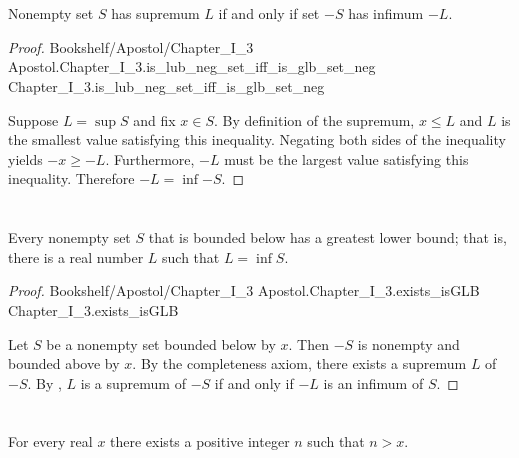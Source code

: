 \documentclass{article}
\newcommand{\link}[1]{\lean{../..}
  {Bookshelf/Apostol/Chapter\_I\_3}
  {Apostol.Chapter\_I\_3.#1}
  {Chapter\_I\_3.#1}
}
\begin{document}

\section*{}%
%

Nonempty set $S$ has supremum $L$ if and only if set $-S$ has infimum $-L$.

\begin{proof}

  \link{is\_lub\_neg\_set\_iff\_is\_glb\_set\_neg}

  \divider

  Suppose $L = \sup{S}$ and fix $x \in S$.
  By definition of the supremum, $x \leq L$ and $L$ is the smallest value
    satisfying this inequality.
  Negating both sides of the inequality yields $-x \geq -L$.
  Furthermore, $-L$ must be the largest value satisfying this inequality.
  Therefore $-L = \inf{-S}$.

\end{proof}

\section*{}%
%

Every nonempty set $S$ that is bounded below has a greatest lower bound; that
  is, there is a real number $L$ such that $L = \inf{S}$.

\begin{proof}

  \link{exists\_isGLB}

  \divider

  Let $S$ be a nonempty set bounded below by $x$.
  Then $-S$ is nonempty and bounded above by $x$.
  By the completeness axiom, there exists a supremum $L$ of $-S$.
  By , $L$ is a supremum of $-S$ if and only if $-L$ is an
    infimum of $S$.

\end{proof}

\section*{}%

For every real $x$ there exists a positive integer $n$ such that $n > x$.
\end{document}
